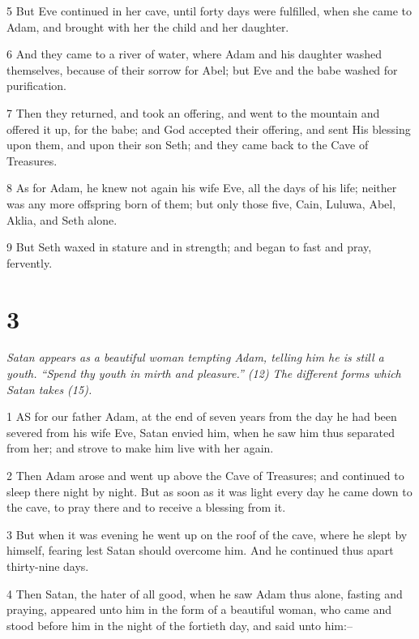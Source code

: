 \par 5 But Eve continued in her cave, until forty days were fulfilled, when she came to Adam, and brought with her the child and her daughter.

\par 6 And they came to a river of water, where Adam and his daughter washed themselves, because of their sorrow for Abel; but Eve and the babe washed for purification.

\par 7 Then they returned, and took an offering, and went to the mountain and offered it up, for the babe; and God accepted their offering, and sent His blessing upon them, and upon their son Seth; and they came back to the Cave of Treasures.

\par 8 As for Adam, he knew not again his wife Eve, all the days of his life; neither was any more offspring born of them; but only those five, Cain, Luluwa, Abel, Aklia, and Seth alone.

\par 9 But Seth waxed in stature and in strength; and began to fast and pray, fervently.

\chapter{3}

\par \textit{Satan appears as a beautiful woman tempting Adam, telling him he is still a youth. “Spend thy youth in mirth and pleasure.” (12) The different forms which Satan takes (15).}

\par 1 AS for our father Adam, at the end of seven years from the day he had been severed from his wife Eve, Satan envied him, when he saw him thus separated from her; and strove to make him live with her again.

\par 2 Then Adam arose and went up above the Cave of Treasures; and continued to sleep there night by night. But as soon as it was light every day he came down to the cave, to pray there and to receive a blessing from it.

\par 3 But when it was evening he went up on the roof of the cave, where he slept by himself, fearing lest Satan should overcome him. And he continued thus apart thirty-nine days.

\par 4 Then Satan, the hater of all good, when he saw Adam thus alone, fasting and praying, appeared unto him in the form of a beautiful woman, who came and stood before him in the night of the fortieth day, and said unto him:--

